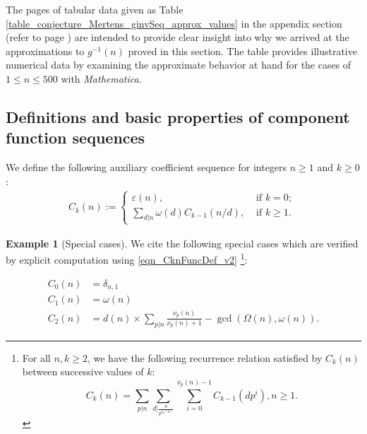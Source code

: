 \documentclass[11pt,reqno,a4letter]{article}
\numberwithin{figure}{section}
\numberwithin{table}{section}
\newcommand{\seqnum}[1]{\href{http://oeis.org/#1}{\color{ProcessBlue}{\underline{#1}}}}
\theoremstyle{plain}
\numberwithin{theorem}{section}
\theoremstyle{definition}
\newtheorem{example}[theorem]{Example}
\newcommand{\NBRef}[1]{}
\begin{document}
The pages of tabular data given as Table \ref{table_conjecture_Mertens_ginvSeq_approx_values} 
in the appendix section (refer to 
page \pageref{table_conjecture_Mertens_ginvSeq_approx_values}) are intended to 
provide clear insight into why we arrived at the approximations to 
$g^{-1}(n)$ proved in this section. The table provides illustrative 
numerical data by examining the approximate behavior 
at hand for the cases of $1 \leq n \leq 500$ with \emph{Mathematica}. 

\subsection{Definitions and basic properties of component function sequences} 

We define the following auxiliary coefficient sequence for integers $n \geq 1$ and $k \geq 0$: 
\begin{align} 
\label{eqn_CknFuncDef_v2} 
C_k(n) := \begin{cases} 
     \varepsilon(n), & \text{ if $k = 0$; } \\ 
     \sum\limits_{d|n} \omega(d) C_{k-1}(n/d), & \text{ if $k \geq 1$. } 
     \end{cases} 
\end{align} 

\begin{example}[Special cases] 
\label{example_SpCase_Ckn} 
We cite the following special cases which are verified by 
explicit computation using \eqref{eqn_CknFuncDef_v2} 
\cite[\seqnum{A066922}]{OEIS}\footnote{ 
     For all $n,k \geq 2$, we have the following recurrence 
     relation satisfied by $C_k(n)$ between successive values of $k$: 
     \begin{equation*}
     C_k(n) = \sum_{p|n} \sum_{d\rvert\frac{n}{p^{\nu_p(n)}}} \sum_{i=0}^{\nu_p(n)-1} 
          C_{k-1}\left(dp^i\right), n \geq 1. 
     \end{equation*}
}: 
\NBRef{A07-2020-04-26} 
\begin{align*} 
C_0(n) & = \delta_{n,1} \\ 
C_1(n) & = \omega(n) \\ 
C_2(n) & = d(n) \times \sum_{p|n} \frac{\nu_p(n)}{\nu_p(n)+1} - \gcd\left(\Omega(n), \omega(n)\right). 
\end{align*} 
\end{example} 
\end{document}
